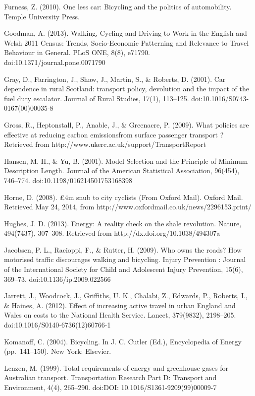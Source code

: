 Furness, Z. (2010). One less car: Bicycling and the politics of
automobility. Temple University Press.

Goodman, A. (2013). Walking, Cycling and Driving to Work in the English
and Welsh 2011 Census: Trends, Socio-Economic Patterning and Relevance
to Travel Behaviour in General. PLoS ONE, 8(8), e71790.
doi:10.1371/journal.pone.0071790

Gray, D., Farrington, J., Shaw, J., Martin, S., \& Roberts, D. (2001).
Car dependence in rural Scotland: transport policy, devolution and the
impact of the fuel duty escalator. Journal of Rural Studies, 17(1),
113--125. doi:10.1016/S0743-0167(00)00035-8

Gross, R., Heptonstall, P., Anable, J., \& Greenacre, P. (2009). What
policies are effective at reducing carbon emissionsfrom surface
passenger transport ? Retrieved from
http://www.ukerc.ac.uk/support/TransportReport

Hansen, M. H., \& Yu, B. (2001). Model Selection and the Principle of
Minimum Description Length. Journal of the American Statistical
Association, 96(454), 746--774. doi:10.1198/016214501753168398

Horne, D. (2008). £4m snub to city cyclists (From Oxford Mail). Oxford
Mail. Retrieved May 24, 2014, from
http://www.oxfordmail.co.uk/news/2296153.print/

Hughes, J. D. (2013). Energy: A reality check on the shale revolution.
Nature, 494(7437), 307--308. Retrieved from
http://dx.doi.org/10.1038/494307a

Jacobsen, P. L., Racioppi, F., \& Rutter, H. (2009). Who owns the roads?
How motorised traffic discourages walking and bicycling. Injury
Prevention : Journal of the International Society for Child and
Adolescent Injury Prevention, 15(6), 369--73. doi:10.1136/ip.2009.022566

Jarrett, J., Woodcock, J., Griffiths, U. K., Chalabi, Z., Edwards, P.,
Roberts, I., \& Haines, A. (2012). Effect of increasing active travel in
urban England and Wales on costs to the National Health Service. Lancet,
379(9832), 2198--205. doi:10.1016/S0140-6736(12)60766-1

Komanoff, C. (2004). Bicycling. In J. C. Cutler (Ed.), Encyclopedia of
Energy (pp.~141--150). New York: Elsevier.

Lenzen, M. (1999). Total requirements of energy and greenhouse gases for
Australian transport. Transportation Research Part D: Transport and
Environment, 4(4), 265--290. doi:DOI: 10.1016/S1361-9209(99)00009-7

